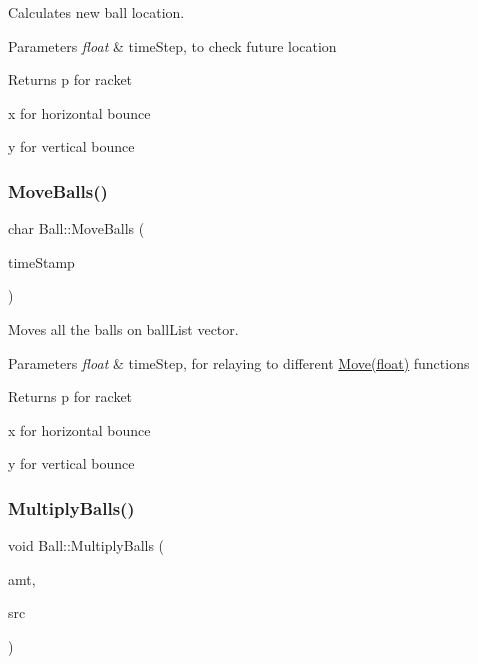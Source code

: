 Calculates new ball location. 


\begin{DoxyParams}{Parameters}
{\em float} & time\+Step, to check future location\\
\hline
\end{DoxyParams}
\begin{DoxyReturn}{Returns}
\textquotesingle{}p\textquotesingle{} for racket 

\textquotesingle{}x\textquotesingle{} for horizontal bounce 

\textquotesingle{}y\textquotesingle{} for vertical bounce 
\end{DoxyReturn}
\mbox{\label{class_ball_a8625cadb0e2072ad743325696d326176}} 
\subsubsection{\texorpdfstring{Move\+Balls()}{MoveBalls()}}
{\footnotesize\ttfamily char Ball\+::\+Move\+Balls (\begin{DoxyParamCaption}\item[{float}]{time\+Stamp }\end{DoxyParamCaption})\hspace{0.3cm}{\ttfamily [static]}}



Moves all the balls on ball\+List vector. 


\begin{DoxyParams}{Parameters}
{\em float} & time\+Step, for relaying to different \hyperlink{class_ball_a6afd96091f6ddeaf12c77c7a3857f3f9}{Move(float)} functions\\
\hline
\end{DoxyParams}
\begin{DoxyReturn}{Returns}
\textquotesingle{}p\textquotesingle{} for racket 

\textquotesingle{}x\textquotesingle{} for horizontal bounce 

\textquotesingle{}y\textquotesingle{} for vertical bounce 
\end{DoxyReturn}
\mbox{\label{class_ball_ab7c303f4d158af0722e379eeeae72db6}} 
\subsubsection{\texorpdfstring{Multiply\+Balls()}{MultiplyBalls()}}
{\footnotesize\ttfamily void Ball\+::\+Multiply\+Balls (\begin{DoxyParamCaption}\item[{int}]{amt,  }\item[{\hyperlink{class_ball}{Ball} \&}]{src }\end{DoxyParamCaption})}




